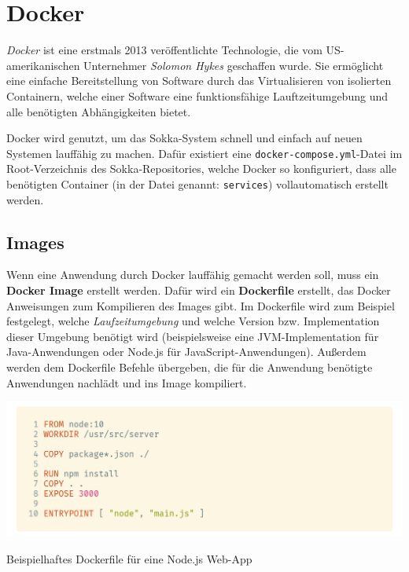 \section{Docker}

\textit{Docker} ist eine erstmals 2013 veröffentlichte Technologie, die vom US-amerikanischen Unternehmer \textit{Solomon Hykes} geschaffen wurde. \cite{hykes2018} Sie ermöglicht eine einfache Bereitstellung von Software durch das Virtualisieren von isolierten Containern, welche einer Software eine funktionsfähige Lauftzeitumgebung und alle benötigten Abhängigkeiten bietet.

Docker wird genutzt, um das Sokka-System schnell und einfach auf neuen Systemen lauffähig zu machen. Dafür existiert eine \lstinline{docker-compose.yml}-Datei im Root-Verzeichnis des Sokka-Repositories, welche Docker so konfiguriert, dass alle benötigten Container (in der Datei genannt: \lstinline{services}) vollautomatisch erstellt werden.

\subsection{Images}

Wenn eine Anwendung durch Docker lauffähig gemacht werden soll, muss ein \textbf{Docker Image} erstellt werden. Dafür wird ein \textbf{Dockerfile} erstellt, das Docker Anweisungen zum Kompilieren des Images gibt. Im Dockerfile wird zum Beispiel festgelegt, welche \textit{Laufzeitumgebung} und welche Version bzw. Implementation dieser Umgebung benötigt wird (beispielsweise eine JVM-Implementation für Java-Anwendungen oder Node.js für JavaScript-Anwendungen). Außerdem werden dem Dockerfile Befehle übergeben, die für die Anwendung benötigte Anwendungen nachlädt und ins Image kompiliert.

\begin{code}[htp]
    \begin{center}
        \includegraphics[width=1\textwidth]{images/Docker/dockerfile.png}
        \vspace{-25pt}
        \caption{Beispielhaftes Dockerfile für eine Node.js Web-App}
    \end{center}
\end{code}

